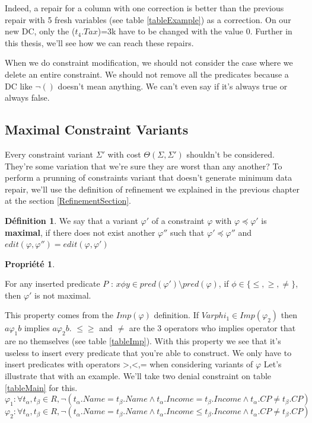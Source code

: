 \documentclass[letterpaper, 12pt]{report}
\theoremstyle{definition}
\newtheorem{mydef}{Définition}
\newtheorem{myprop}{Propriété}
\begin{document}
Indeed, a repair for a column with one correction is better than the previous repair with 5 fresh variables (see table \ref{tableExample}) as a correction. On our new DC, only the ($t_4.Tax$)=3k have to be changed with the value 0. Further in this thesis, we'll see how we can reach these repairs.

When we do constraint modification, we should not consider the case where we delete an entire constraint.  We should not remove all the predicates because a DC like $\neg()$ doesn't mean anything. We can't even say if it's always true or always false.

\subsection{Maximal Constraint Variants}

	Every constraint variant $\Sigma'$ with cost $\Theta(\Sigma,\Sigma')$ shouldn't be considered. They're some variation that we're sure they are worst than any another? To perform a prunning of constraints variant that doesn't generate minimum data repair, we'll use the definition of refinement we explained in the previous chapter at the section \ref{RefinementSection}.
	
\begin{mydef}\cite{main}
 We say that a variant $\varphi '$ of a constraint $\varphi$ with $\varphi \preceq \varphi'$ is \textbf{maximal}, if there does not exist another $\varphi ''$ such that $\varphi ' \preceq \varphi ''$ and $edit(\varphi,\varphi'') = edit (\varphi,\varphi')$
\end{mydef}

\begin{myprop}\cite{main}

For any inserted predicate $ P $ : $x \phi y \in pred(\varphi ') \setminus pred(\varphi)$, if $\phi \in \{\leq,\geq,\neq \}$, then $\varphi '$ is not maximal.

\end{myprop}

This property comes from the $Imp(\varphi)$ definition. If $Varphi_1 \in Imp(\varphi_2)$ then $a\varphi_1 b$ implies $a \varphi_2 b$. $\leq \geq$ and $\neq$ are the 3 operators who implies operator that are no themselves (see table \ref{tableImp}). With this property we see that it's useless to insert every predicate that you're able to construct. We only have to insert predicates with operators {>,<,=} when considering variants of $\varphi$ Let's illustrate that with an example. We'll take two denial constraint on table \ref{tableMain} for this.
$$\varphi_1 : \forall t_\alpha,t_\beta \in R, \neg( t_\alpha.Name = t_\beta.Name \wedge t_\alpha.Income = t_\beta.Income \wedge t_\alpha.CP \neq t_\beta.CP )$$
$$\varphi_2 : \forall t_\alpha,t_\beta \in R, \neg( t_\alpha.Name = t_\beta.Name \wedge t_\alpha.Income \leq t_\beta.Income \wedge t_\alpha.CP \neq t_\beta.CP )$$
\end{document}
